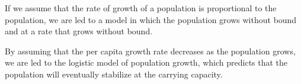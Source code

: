 

\begin{summary}
\item If we assume that the rate of growth of a population is
  proportional to the population, we are led to a model in which the
  population grows without bound and at a  rate that grows without bound. 
\item By assuming that the per capita growth rate decreases as the
  population grows, we are led to the logistic model of population
  growth, which predicts that the population will eventually
  stabilize at the carrying capacity.
\end{summary}

\nin \hrulefill

 




\clearpage
